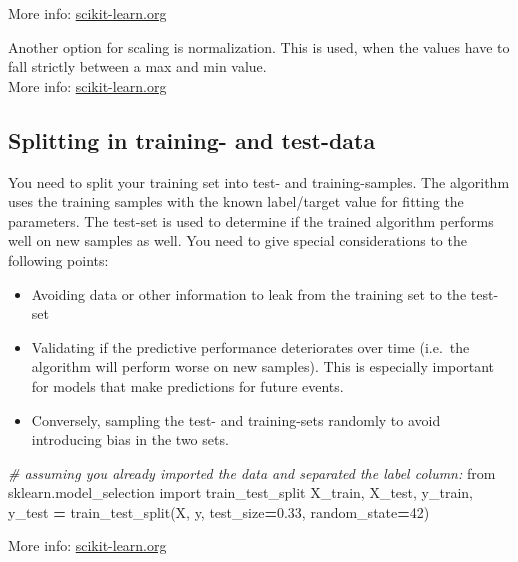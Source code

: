\documentclass[
]{book}
\newenvironment{Shaded}{\begin{snugshade}}{\end{snugshade}}
\newcommand{\CommentTok}[1]{\textcolor[rgb]{0.56,0.35,0.01}{\textit{#1}}}
\newcommand{\DecValTok}[1]{\textcolor[rgb]{0.00,0.00,0.81}{#1}}
\newcommand{\FloatTok}[1]{\textcolor[rgb]{0.00,0.00,0.81}{#1}}
\newcommand{\ImportTok}[1]{#1}
\newcommand{\NormalTok}[1]{#1}
\newcommand{\OperatorTok}[1]{\textcolor[rgb]{0.81,0.36,0.00}{\textbf{#1}}}
\begin{document}
More info:
\href{https://scikit-learn.org/stable/modules/generated/sklearn.model_selection.train_test_split.html}{scikit-learn.org}

Another option for scaling is normalization. This is used, when the
values have to fall strictly between a max and min value.\\
More info:
\href{https://scikit-learn.org/stable/modules/preprocessing.html\#normalization}{scikit-learn.org}

\hypertarget{splitting-in-training--and-test-data}{%
\subsection{Splitting in training- and test-data}\label{splitting-in-training--and-test-data}}

You need to split your training set into test- and training-samples. The
algorithm uses the training samples with the known label/target value
for fitting the parameters. The test-set is used to determine if the
trained algorithm performs well on new samples as well. You need to give
special considerations to the following points:

\begin{itemize}
\item
  Avoiding data or other information to leak from the training set to
  the test-set
\item
  Validating if the predictive performance deteriorates over time
  (i.e.~the algorithm will perform worse on new samples). This is
  especially important for models that make predictions for future
  events.
\item
  Conversely, sampling the test- and training-sets randomly to avoid
  introducing bias in the two sets.
\end{itemize}

\begin{Shaded}
\begin{Highlighting}[]
\CommentTok{\# assuming you already imported the data and separated the label column:}
\ImportTok{from}\NormalTok{ sklearn.model\_selection }\ImportTok{import}\NormalTok{ train\_test\_split}
\NormalTok{X\_train, X\_test, y\_train, y\_test }\OperatorTok{=}\NormalTok{ train\_test\_split(X, y, test\_size}\OperatorTok{=}\FloatTok{0.33}\NormalTok{, random\_state}\OperatorTok{=}\DecValTok{42}\NormalTok{)}
\end{Highlighting}
\end{Shaded}

More info:
\href{https://scikit-learn.org/stable/modules/generated/sklearn.model_selection.train_test_split.html}{scikit-learn.org}
\end{document}
